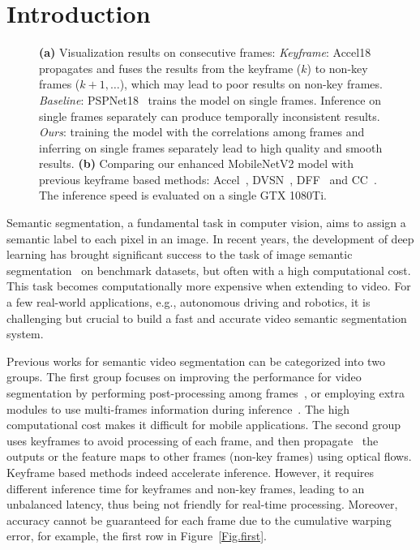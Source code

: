 \documentclass[runningheads]{llncs}
\begin{document}
\section{Introduction}
\begin{figure}[thb]
\centering  {}
\caption{\textbf{(a)} Visualization results on consecutive frames: \textit{Keyframe}: 
Accel18~\cite{jain2019accel} propagates and fuses the results from the keyframe ($k$) to 
non-key
frames ($k+1,\dots$), which may lead to
poor results on non-key
frames. \textit{Baseline}: PSPNet18~\cite{zhao2017pyramid} trains the model on single frames. Inference on single frames separately 
can
produce temporally  inconsistent results. 
\textit{Ours}: training the model with the correlations among frames and inferring on single frames separately lead to
high quality and smooth results.
\textbf{(b)}
Comparing our enhanced MobileNetV2 model with previous keyframe based methods: Accel~\cite{jain2019accel}, DVSN~\cite{xu2018dynamic}, DFF~\cite{zhu2017deep} and  CC~\cite{shelhamer2016clockwork}. The inference speed is evaluated on a single GTX 1080Ti.}

\end{figure}
Semantic segmentation, a fundamental task in computer vision, aims to assign a semantic label to each pixel in an image. In recent years, the development of deep learning has brought significant success to the task of image semantic segmentation~\cite{zhao2017pyramid,tian2019decoders,chen2018deeplab} on benchmark datasets, but often with a high computational cost. This task 
becomes 
computationally 
more expensive when extending to video.
For a few real-world applications, e.g., autonomous driving and robotics, it is challenging but crucial to build a fast and accurate video semantic segmentation system.



Previous works for semantic video segmentation can be categorized into two groups.
The first group focuses on improving the performance for video segmentation by performing
post-processing among frames~\cite{liu2017surveillance}, or employing extra modules to use multi-frames information during inference~\cite{gadde2017semantic}. The high computational cost makes it difficult for mobile applications.
The second group uses keyframes to avoid processing of each frame, and 
then 
propagate~\cite{zhu2017deep,zhu2018towards,xu2018dynamic} the outputs or the feature maps to other frames (non-key
frames)
using 
optical flows. Keyframe based methods 
indeed accelerate inference. 
However, it requires different inference time for keyframes and 
non-key
frames, 
leading to an unbalanced latency, thus being not friendly for real-time processing. 
Moreover, accuracy cannot be guaranteed for each frame 
due to the cumulative warping error, for example, the first row in Figure~\ref{Fig.first}.
\end{document}
